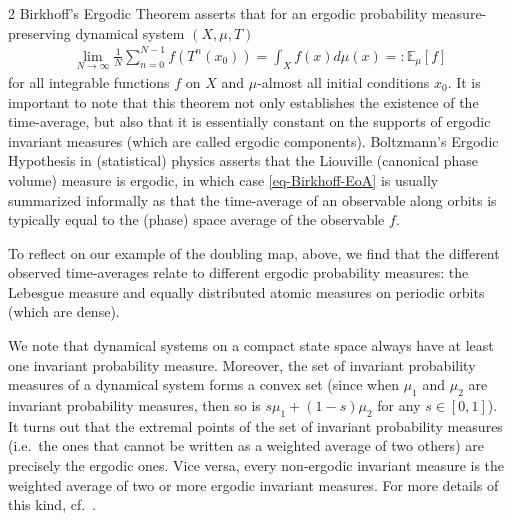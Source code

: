 \documentclass[11pt]{article}
\begin{document}
\begin{multicols}{2}
Birkhoff's Ergodic Theorem \cite{Birkhoff1931} asserts that for an ergodic probability measure-preserving dynamical system $(X,\mu,T)$
\begin{align}
\label{eq-Birkhoff-EoA}
\lim_{N \to \infty} \frac{1}{N} \sum_{n=0}^{N-1} f(T^n (x_0)) = \int_X f(x) d\mu(x)=:\mathbb{E}_\mu[f]
\end{align}
for all integrable functions $f$ on $X$ and $\mu$-almost all initial conditions $x_0$.
It is important to note that this theorem not only establishes the existence of the time-average, but also that it is essentially constant on the supports of ergodic invariant measures (which are called ergodic components).
Boltzmann's Ergodic Hypothesis in (statistical) physics asserts that the Liouville (canonical phase volume) measure is ergodic, in which case \eqref{eq-Birkhoff-EoA} is usually summarized informally as that the time-average of an observable along orbits is typically equal to the (phase) space average of the observable $f$.

To reflect on our example of the doubling map, above, we find that the different observed time-averages relate to different ergodic probability measures: the Lebesgue measure and equally distributed atomic measures on periodic orbits (which are dense).

We note that dynamical systems on a compact state space always have at least one invariant probability measure. Moreover, the set of invariant probability measures of a dynamical system forms a convex set (since when $\mu_1$ and $\mu_2$ are invariant probability measures, then so is $s\mu_1+(1-s)\mu_2$ for any $s\in [0,1]$). It turns out that the extremal points of the set of invariant probability measures (i.e.\ the ones that cannot be written as a weighted average of two others) are precisely the ergodic ones. Vice versa, every non-ergodic invariant measure is the weighted average of two or more ergodic invariant measures. For more details of this kind, cf.~\cite{walters2000introduction}.


\end{multicols}
\end{document}
